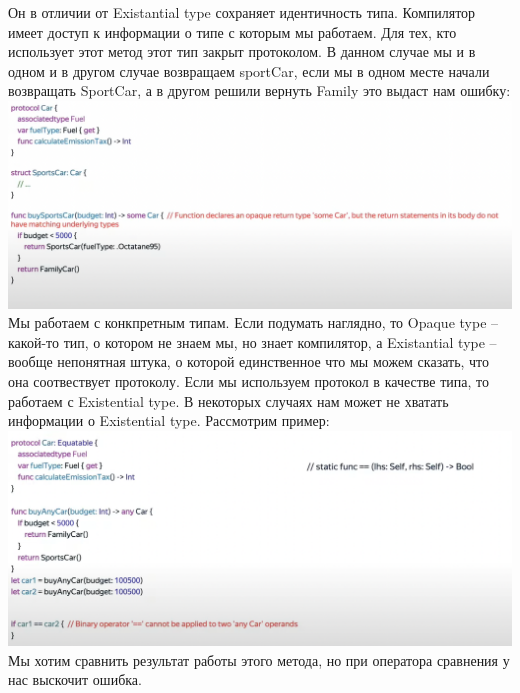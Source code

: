 \documentclass{article}
\begin{document}
    \newline
    Он в отличии от Existantial type сохраняет идентичность типа. Компилятор имеет доступ к информации о типе с которым мы работаем. Для тех, кто использует этот метод этот тип закрыт протоколом. В данном случае мы и в одном и в другом случае возвращаем sportCar, если мы в одном месте начали возвращать SportCar, а в другом решили вернуть Family это выдаст нам ошибку:
    \newline
    \includegraphics[scale = 0.5 ]{pic/Снимок экрана 2023-07-28 в 23.07.44.png}
    \newline
    Мы работаем с конкпретным типам. Если подумать наглядно, то Opaque type -- какой-то тип, о котором не знаем мы, но знает компилятор, а Existantial type -- вообще непонятная штука, о которой единственное что мы можем сказать, что она соотвествует протоколу. 
    \newline
    Если мы используем протокол в качестве типа, то работаем с Existential type.
    \newline
    В некоторых случаях нам может не хватать информации о Existential type. Рассмотрим пример: 
    \newline
    \includegraphics[scale = 0.5]{pic/Снимок экрана 2023-07-28 в 23.14.36.png}
    \newline
    Мы хотим сравнить результат работы этого метода, но при оператора сравнения у нас выскочит ошибка. 
    \newline
\end{document}
